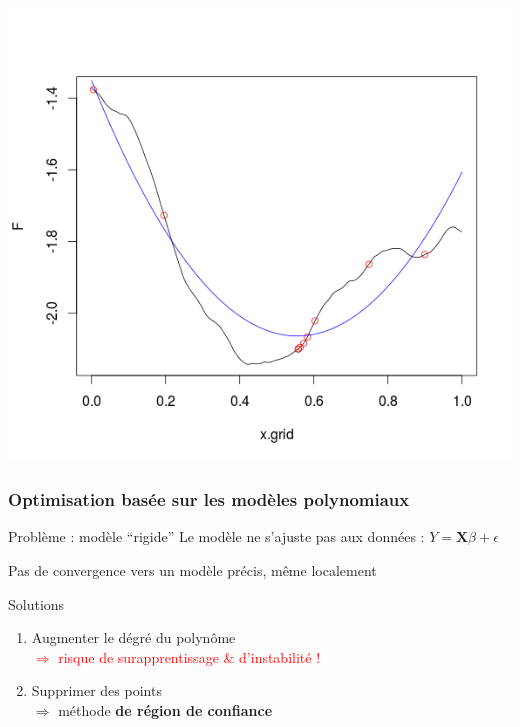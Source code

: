 \begin{frame}
\includegraphics[trim = 10mm 20mm 10mm 10mm, clip, width=.3\paperwidth]{fig/prs7.png}
\end{frame}
\begin{frame}
\frametitle{Optimisation basée sur les modèles polynomiaux}
\begin{block}{Problème : modèle ``rigide''}
Le modèle ne s'ajuste pas aux données : 
$ Y = \mathbf{X} \beta + \epsilon $

Pas de convergence vers un modèle précis, même localement
\end{block}

\begin{exampleblock}{Solutions}
\begin{enumerate}
 \item Augmenter le dégré du polynôme \\
 \textcolor{red}{$\Rightarrow$ risque de surapprentissage \& d'instabilité !}
 \item Supprimer des points \\
 $\Rightarrow$ méthode \textbf{de région de confiance}
\end{enumerate}
\end{exampleblock}
\end{frame}

